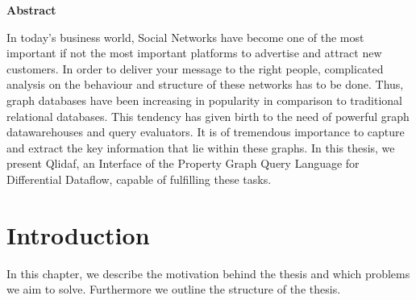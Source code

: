 \documentclass[11pt,singlecolumn]{scrartcl}
\begin{document}
\hspace{60mm}
\begin{center}
 \textbf{Abstract} \end{center}
In today's business world, Social Networks have become one of the most important if not the most important platforms to advertise and attract new customers. In order to deliver your message to the right people, complicated analysis on the behaviour and structure of these networks has to be done. Thus, graph databases have been increasing in popularity in comparison to traditional relational databases. This tendency has given birth to the need of powerful graph datawarehouses and query evaluators. It is of tremendous importance to capture and extract the key information that lie within these graphs. In this thesis, we present Qlidaf, an Interface of the Property Graph Query Language for Differential Dataflow, capable of fulfilling these tasks.

\clearpage
\tableofcontents
\clearpage
\listoffigures
\clearpage


\section{Introduction}
In this chapter, we describe the motivation behind the thesis and which problems we aim to solve. Furthermore we outline the structure of the thesis.
\end{document}
